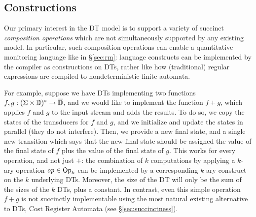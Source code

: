 \subsection{Constructions}
\label{sec:constructions}

Our primary interest in the DT model is to support a variety of succinct \emph{composition operations} which are not simultaneously supported by any existing model. In particular, such composition operations can enable a quantitative monitoring language like \QREpast{} in \S\ref{sec:rm}: language constructs can be implemented by the compiler as constructions on DTs, rather like how (traditional) regular expressions are compiled to nondeterministic finite automata.

For example, suppose we have DTs implementing two functions $f, g: (\Sigma \times \mathbb{D})^{*} \to \overline{\mathbb{D}{}}$, and we would like to implement the function $f + g$, which applies $f$ and $g$ to the input stream and adds the results.
To do so, we copy the states of the transducers for $f$ and $g$,
and we initialize and update the states in parallel (they do not interfere).
Then, we provide a new final state, and a single new transition which says that the new final state should be assigned the value of the final state of $f$ plus the value of the final state of $g$.
This works for every operation, and not just $+$: the combination of $k$ computations by applying a $k$-ary operation $\mathit{op} \in \textsf{Op}_k$ can be implemented by a corresponding $k$-ary construct on the $k$ underlying DTs. Moreover, the size of the DT will only be the sum of the sizes of the $k$ DTs, plus a constant.
In contrast, even this simple operation $f+g$ is not succinctly implementable using the most natural existing alternative to DTs, Cost Register Automata (see \S\ref{sec:succinctness}).

